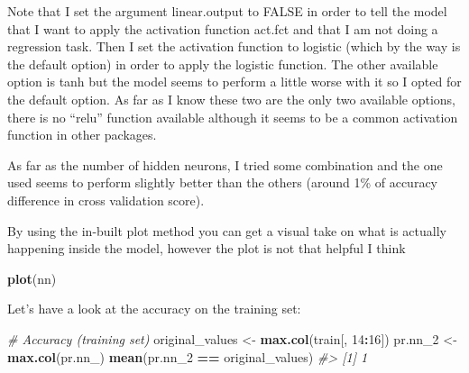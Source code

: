 \documentclass[]{book}
\newenvironment{Shaded}{\begin{snugshade}}{\end{snugshade}}
\newcommand{\CommentTok}[1]{\textcolor[rgb]{0.56,0.35,0.01}{\textit{#1}}}
\newcommand{\DecValTok}[1]{\textcolor[rgb]{0.00,0.00,0.81}{#1}}
\newcommand{\KeywordTok}[1]{\textcolor[rgb]{0.13,0.29,0.53}{\textbf{#1}}}
\newcommand{\NormalTok}[1]{#1}
\newcommand{\OperatorTok}[1]{\textcolor[rgb]{0.81,0.36,0.00}{\textbf{#1}}}
\newcommand{\StringTok}[1]{\textcolor[rgb]{0.31,0.60,0.02}{#1}}
\begin{document}
Note that I set the argument linear.output to FALSE in order to tell the model that I want to apply the activation function act.fct and that I am not doing a regression task. Then I set the activation function to logistic (which by the way is the default option) in order to apply the logistic function. The other available option is tanh but the model seems to perform a little worse with it so I opted for the default option. As far as I know these two are the only two available options, there is no ``relu'' function available although it seems to be a common activation function in other packages.

As far as the number of hidden neurons, I tried some combination and the one used seems to perform slightly better than the others (around 1\% of accuracy difference in cross validation score).

By using the in-built plot method you can get a visual take on what is actually happening inside the model, however the plot is not that helpful I think

\begin{Shaded}
\begin{Highlighting}[]
\KeywordTok{plot}\NormalTok{(nn)}
\end{Highlighting}
\end{Shaded}

Let's have a look at the accuracy on the training set:

\begin{Shaded}
\end{Shaded}

\begin{Shaded}
\begin{Highlighting}[]
\CommentTok{# Accuracy (training set)}
\NormalTok{original_values <-}\StringTok{ }\KeywordTok{max.col}\NormalTok{(train[, }\DecValTok{14}\OperatorTok{:}\DecValTok{16}\NormalTok{])}
\NormalTok{pr.nn_}\DecValTok{2}\NormalTok{ <-}\StringTok{ }\KeywordTok{max.col}\NormalTok{(pr.nn_)}
\KeywordTok{mean}\NormalTok{(pr.nn_}\DecValTok{2} \OperatorTok{==}\StringTok{ }\NormalTok{original_values)}
\CommentTok{#> [1] 1}
\end{Highlighting}
\end{Shaded}
\end{document}
